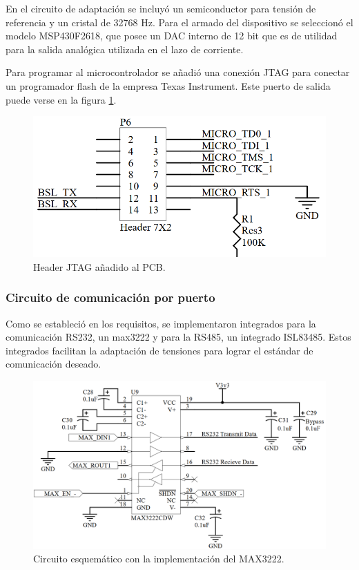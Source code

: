 En el circuito de adaptación se incluyó un semiconductor para tensión de referencia y un cristal de 32768 Hz. Para el armado del dispositivo se seleccionó el modelo MSP430F2618, que posee un DAC interno de 12 bit que es de utilidad para la salida analógica utilizada en el lazo de corriente.

Para programar al microcontrolador se añadió una conexión JTAG para conectar un programador flash de la empresa Texas Instrument. Este puerto de salida puede verse en la figura \ref{fig:jitag}.

\begin{figure}[!htb]
	\centering
	\includegraphics[width=120mm,keepaspectratio]{Figures/JTAG1.png}
	\caption{Header JTAG añadido al PCB.}
	\label{fig:jitag}
\end{figure}

\subsubsection{Circuito de comunicación por puerto}
Como se estableció en los requisitos, se implementaron integrados para la comunicación RS232, un max3222 y para la RS485, un integrado ISL83485. Estos integrados facilitan la adaptación de tensiones para lograr el estándar de comunicación deseado.

\begin{figure}[!htb]
	\centering
	\includegraphics[width=120mm,keepaspectratio]{Figures/RSS232_1.png}
	\caption{Circuito esquemático con la implementación del MAX3222.}
	\label{fig:2321esquem}
\end{figure}


